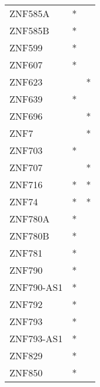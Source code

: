 \begin{longtable}{lcc}
ZNF585A      &         * &         \\
ZNF585B      &         * &         \\
ZNF599       &         * &         \\
ZNF607       &         * &         \\
ZNF623       &           &       * \\
ZNF639       &         * &         \\
ZNF696       &           &       * \\
ZNF7         &           &       * \\
ZNF703       &         * &         \\
ZNF707       &           &       * \\
ZNF716       &         * &       * \\
ZNF74        &         * &       * \\
ZNF780A      &         * &         \\
ZNF780B      &         * &         \\
ZNF781       &         * &         \\
ZNF790       &         * &         \\
ZNF790-AS1   &         * &         \\
ZNF792       &         * &         \\
ZNF793       &         * &         \\
ZNF793-AS1   &         * &         \\
ZNF829       &         * &         \\
ZNF850       &         * &         \\
\end{longtable}
